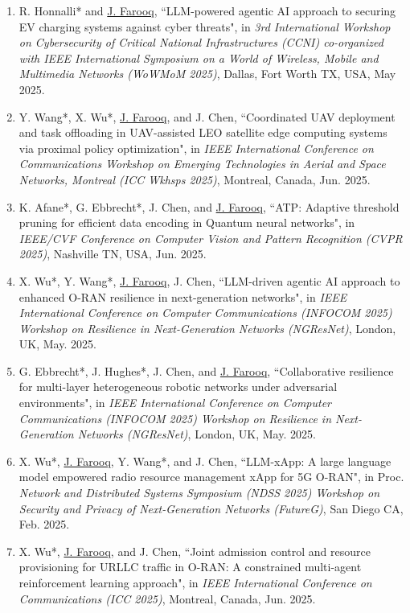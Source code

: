 \documentclass[letterpaper,11pt]{article}
\begin{document}
\begin{enumerate}
    \item[\rm{[C33]}] R. Honnalli* and \underline{J. Farooq}, ``LLM-powered agentic AI approach to securing EV charging systems against cyber threats", in \textit{3rd International Workshop on Cybersecurity of Critical National Infrastructures (CCNI) co-organized with IEEE International Symposium on a World of Wireless, Mobile and Multimedia Networks (WoWMoM 2025)}, Dallas, Fort Worth TX, USA, May 2025.
    \item[\rm{[C32]}] Y. Wang*, X. Wu*, \underline{J. Farooq}, and J. Chen, ``Coordinated UAV deployment and task offloading in UAV-assisted LEO satellite edge computing systems via proximal policy optimization", in \textit{IEEE International Conference on Communications Workshop on Emerging Technologies in Aerial and Space Networks, Montreal (ICC Wkhsps 2025)}, Montreal, Canada, Jun. 2025.
      \item[\rm{[C31]}] K. Afane*, G. Ebbrecht*, J. Chen, and \underline{J. Farooq}, ``ATP: Adaptive threshold pruning for efficient data encoding in Quantum neural networks", in \textit{IEEE/CVF Conference on Computer Vision and Pattern Recognition (CVPR 2025)}, Nashville TN, USA, Jun. 2025.
      \item[\rm{[C30]}] X. Wu*, Y. Wang*, \underline{J. Farooq}, J. Chen, ``LLM-driven agentic AI approach to enhanced O-RAN resilience in next-generation networks", in \textit{IEEE International Conference on Computer Communications (INFOCOM 2025) Workshop on Resilience in Next-Generation Networks (NGResNet)}, London, UK, May. 2025.
      \item[\rm{[C29]}] G. Ebbrecht*, J. Hughes*, J. Chen,  and \underline{J. Farooq}, ``Collaborative resilience for multi-layer heterogeneous robotic networks under adversarial environments", in \textit{IEEE International Conference on Computer Communications (INFOCOM 2025) Workshop on Resilience in Next-Generation Networks (NGResNet)}, London, UK, May. 2025.
      \item[\rm{[C28]}] X. Wu*, \underline{J. Farooq}, Y. Wang*, and J. Chen, ``LLM-xApp: A large language model empowered radio resource management xApp for 5G O-RAN", in Proc. \textit{Network and Distributed Systems Symposium (NDSS 2025) Workshop on Security and Privacy of Next-Generation Networks (FutureG)}, San Diego CA, Feb. 2025.
      \item[\rm{[C27]}] X. Wu*, \underline{J. Farooq}, and J. Chen, ``Joint admission control and resource provisioning for URLLC traffic in O-RAN: A constrained multi-agent reinforcement learning approach", in \textit{IEEE International Conference on Communications (ICC 2025)}, Montreal, Canada, Jun. 2025.

\end{enumerate}
\end{document}
